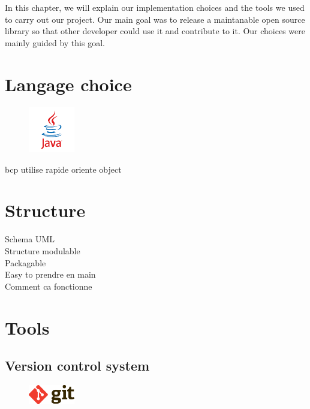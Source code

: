 In this chapter, we will explain our implementation choices and the tools we used to carry out our project. Our main goal was to release a maintanable open source library so that other developer could use it and contribute to it. Our choices were mainly guided by this goal.

\section{Langage choice}

\begin{figure}
	\vspace{-5mm}
	\includegraphics[width =2cm]{images/Java_logo.png}
\end{figure}

bcp utilise
rapide
oriente object

\section{Structure}

Schema UML\\
Structure modulable\\
Packagable\\
Easy to prendre en main\\
Comment ca fonctionne\\

\section{Tools}

\subsection{Version control system}

\begin{figure}
	\vspace{-5mm}
	\includegraphics[width =2cm]{images/Git-logo.png}
\end{figure}

